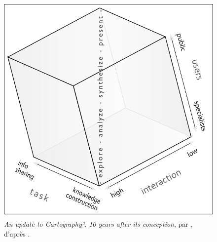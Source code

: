			\begin{figure}[H]
				\hspace*{\fill}%
				\begin{minipage}[t]{.46\linewidth}
					\centering
					\captionsetup{width=.9\linewidth}
					\vspace{0pt}
					\includegraphics[width=\linewidth]{img/CV35-Fig2a-600.png}
					\caption{\og \textit{An update to Cartography³, 10 years after its conception}\fg{}, par \cite{coltekin_geovisualization_2018}, d'après \cite[10]{maceachren_geovisualization_2004}.}
					\label{fig:cartography3}
				\end{minipage} \hfill
				\begin{minipage}[t]{.46\linewidth}
					\centering
					\captionsetup{width=.9\linewidth}
					\vspace{0pt}

\end{minipage}
\end{figure}
